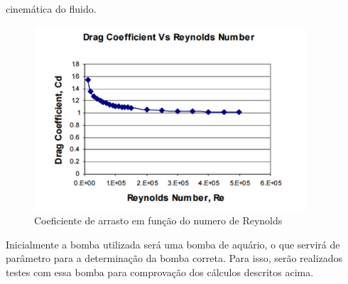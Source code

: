 \begin{description}
cinemática do fluido.
\par
\begin{figure}[h]
  \centering
  \includegraphics[width=0.9\textwidth]{figures/graphic-reynolds.png}
  \caption{Coeficiente de arrasto em função do numero de Reynolds}
  \label{fig:graphic-reynolds}
\end{figure}
\FloatBarrier
\par
Inicialmente a bomba utilizada será uma bomba de aquário, o que servirá de
parâmetro para a determinação da bomba correta. Para isso, serão realizados
testes com essa bomba para comprovação dos cálculos descritos acima.


\end{description}
